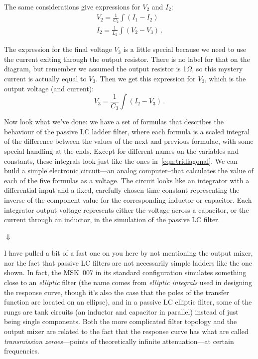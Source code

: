 The same considerations give expressions for $V_2$ and $I_2$:
\begin{gather*}
  V_2 = \frac{1}{C_2} \int (I_1-I_2) \\
  I_2 = \frac{1}{L_2} \int (V_2-V_3) \, .
\end{gather*}

The expression for the final voltage $V_3$ is a little special because we
need to use the current exiting through the output resistor.  There is no
label for that on the diagram, but remember we assumed the output resistor
is 1$\Omega$, so this mystery current is actually equal to $V_3$.  Then we
get this expression for $V_3$, which is the output voltage (and current):
\begin{equation*}
  V_3 = \frac{1}{C_3} \int (I_2-V_3) \, .
\end{equation*}

Now look what we've done:  we have a set of formulas that describes the
behaviour of the passive LC ladder filter, where each formula is a scaled
integral of the difference between the values of the next and previous
formulae, with some special handling at the ends.  Except for different
names on the variables and constants, these integrals look just like the
ones in~\eqref{eqn:tridiagonal}.  We can build a simple electronic
circuit---an analog computer--that calculates the value of each of the five
formulas as a voltage.  The circuit looks like an integrator with a
differential input and a fixed, carefully chosen time constant representing
the inverse of the component value for the corresponding inductor or
capacitor.  Each integrator output voltage represents either the voltage
across a capacitor, or the current through an inductor, in the simulation of
the passive LC filter.

{\centering

\vspace{10pt}
{\Huge$\Downarrow$}
\vspace{10pt}

\par}

I have pulled a bit of a fast one on you here by not mentioning the output
mixer, nor the fact that passive LC filters are not necessarily simple
ladders like the one shown.  In fact, the MSK~007 in its standard
configuration simulates something close to an \emph{elliptic} filter (the
name comes from \emph{elliptic integrals} used in designing the response
curve, though it's also the case that the poles of the transfer function are
located on an ellipse), and in a passive LC elliptic filter, some of the
rungs are tank circuits (an inductor and capacitor in parallel)
instead of just being single components.  Both the more complicated filter
topology and the output mixer are related to the fact that the response
curve has what are called \emph{transmission zeroes}---points of
theoretically infinite attenuation---at certain frequencies.

